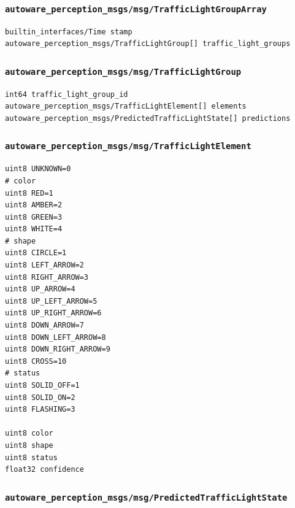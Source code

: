 \documentclass[
]{article}
\begin{document}
\subsubsection{\texorpdfstring{\texttt{autoware\_perception\_msgs/msg/TrafficLightGroupArray}}{autoware\_perception\_msgs/msg/TrafficLightGroupArray}}\label{autoware_perception_msgsmsgtrafficlightgrouparray}

\begin{verbatim}
builtin_interfaces/Time stamp
autoware_perception_msgs/TrafficLightGroup[] traffic_light_groups
\end{verbatim}

\subsubsection{\texorpdfstring{\texttt{autoware\_perception\_msgs/msg/TrafficLightGroup}}{autoware\_perception\_msgs/msg/TrafficLightGroup}}\label{autoware_perception_msgsmsgtrafficlightgroup}

\begin{verbatim}
int64 traffic_light_group_id
autoware_perception_msgs/TrafficLightElement[] elements
autoware_perception_msgs/PredictedTrafficLightState[] predictions
\end{verbatim}

\subsubsection{\texorpdfstring{\texttt{autoware\_perception\_msgs/msg/TrafficLightElement}}{autoware\_perception\_msgs/msg/TrafficLightElement}}\label{autoware_perception_msgsmsgtrafficlightelement}

\begin{verbatim}
uint8 UNKNOWN=0
# color
uint8 RED=1
uint8 AMBER=2
uint8 GREEN=3
uint8 WHITE=4
# shape
uint8 CIRCLE=1
uint8 LEFT_ARROW=2
uint8 RIGHT_ARROW=3
uint8 UP_ARROW=4
uint8 UP_LEFT_ARROW=5
uint8 UP_RIGHT_ARROW=6
uint8 DOWN_ARROW=7
uint8 DOWN_LEFT_ARROW=8
uint8 DOWN_RIGHT_ARROW=9
uint8 CROSS=10
# status
uint8 SOLID_OFF=1
uint8 SOLID_ON=2
uint8 FLASHING=3

uint8 color
uint8 shape
uint8 status
float32 confidence
\end{verbatim}

\subsubsection{\texorpdfstring{\texttt{autoware\_perception\_msgs/msg/PredictedTrafficLightState}}{autoware\_perception\_msgs/msg/PredictedTrafficLightState}}\label{autoware_perception_msgsmsgpredictedtrafficlightstate}
\end{document}
